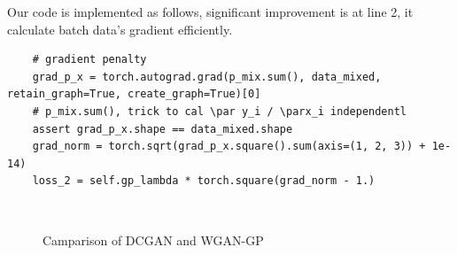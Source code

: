 Our code is implemented as follows, significant improvement is at line 2, it calculate batch data's gradient efficiently.


\begin{lstlisting}
    # gradient penalty
    grad_p_x = torch.autograd.grad(p_mix.sum(), data_mixed, retain_graph=True, create_graph=True)[0]
    # p_mix.sum(), trick to cal \par y_i / \parx_i independentl
    assert grad_p_x.shape == data_mixed.shape
    grad_norm = torch.sqrt(grad_p_x.square().sum(axis=(1, 2, 3)) + 1e-14)
    loss_2 = self.gp_lambda * torch.square(grad_norm - 1.)
\end{lstlisting}

\begin{figure}[htbp]
    \centering
 	\quad
    \\
    \caption{Camparison of DCGAN and WGAN-GP}
    \label{fig:comparison}
\end{figure}
    

